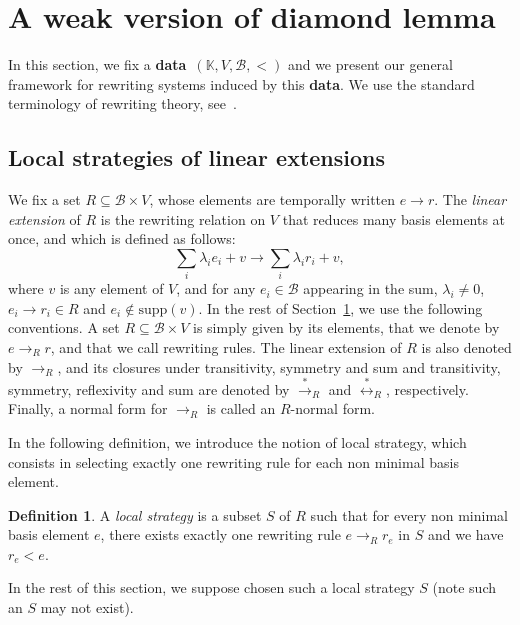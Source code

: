 \documentclass[10pt]{easychair}
\theoremstyle{definition}
\newtheorem{definition}[theorem]{Definition}
\newcommand\data{{\color{red}\bf data}}
\newcommand\supp{\text{supp}}
\newcommand\basis{\mathscr{B}}
\newcommand\K{\mathbb{K}}
\newcommand\rewR{\to_R}
\newcommand\transR{\overset{*}{\to}_R}
\newcommand\equivR{\overset{*}{\leftrightarrow}_R}
\begin{document}
\section{A weak version of diamond lemma}
\label{sec:a_weak_version_of_diamond_lemma}

In this section, we fix a \data\ $(\K,V,\basis,<)$ and we present our 
general framework for rewriting systems induced by this \data. We use the
standard terminology of rewriting theory, see~\cite{MR1629216}.

\subsection{Local strategies of linear extensions}
\label{sec:local_strategies_of_linear_extensions}

We fix a set $R\subseteq\basis\times V$, whose elements are temporally
written $e\to r$. The {\em linear extension} of $R$ is the rewriting
relation on $V$ that reduces many basis elements at once, and which is
defined as follows:
\begin{equation}\label{equ:rewriting_step}
  \sum_i\lambda_ie_i+v\to\sum_i\lambda_ir_i+v,
\end{equation}
where $v$ is any element of $V$, and for any $e_i\in\basis$ appearing in
the sum, $\lambda_i\neq 0$, $e_i\to r_i\in R$ and $e_i\notin\supp(v)$. In
the rest of Section~\ref{sec:a_weak_version_of_diamond_lemma}, we use the
following conventions. A set $R\subseteq\basis\times V$ is simply given
by its elements, that we denote by $e\rewR r$, and that we call rewriting
rules. The linear extension of $R$ is also denoted by $\rewR$, and its
closures under transitivity, symmetry and sum and transitivity, symmetry,
reflexivity and sum are denoted by $\transR$ and $\equivR$, respectively.
Finally, a normal form for $\rewR$ is called an $R$-normal form.
\medskip

In the following definition, we introduce the notion of local strategy,
which consists in selecting exactly one rewriting rule for each non
minimal basis element.

\begin{definition}
  A \emph{local strategy} is a subset $S$ of $R$ such that for every non
  minimal basis element $e$, there exists exactly one rewriting rule
  $e\rewR r_e$ in $S$ and we have $r_e<e$. 
\end{definition}

In the rest of this section, we suppose chosen such a local strategy $S$
(note such an $S$ may not exist). 
\end{document}
